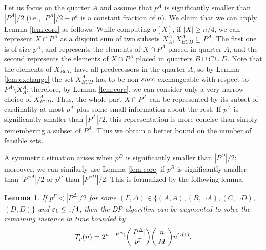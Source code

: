 \documentclass{article}
\newtheorem{lemma}[theorem]{Lemma}
\theoremstyle{definition}
\begin{document}
Let us focus on the quarter $A$ and assume that $p^A$ is significantly smaller than $|P^A|/2$ (i.e., $|P^A|/2 - p^a$ is a constant fraction of $n$).
We claim that we can apply Lemma \ref{lem:core} as follows.
While computing $\sigma[X]$, if $|X| \geq n/4$, we can represent $X \cap P^A$ as a disjoint sum of two subsets $X^A_A, X^A_{BCD} \subseteq P^A$. The first one
is of size $p^A$, and represents the elements of $X \cap P^A$ placed in quarter $A$, and the second represents the elements
of $X \cap P^A$ placed in quarters $B \cup C \cup D$. Note that the elements of $X^A_{BCD}$ have all predecessors in the quarter $A$, so by Lemma \ref{lem:exchange} the set $X^A_{BCD}$ has to be non-${succ}$-exchangeable with respect to $P^A \setminus X_A^A$; therefore, by Lemma \ref{lem:core}, we can consider only a very narrow choice of
$X^A_{BCD}$. Thus, the whole part $X\cap P^A$ can be represented by its subset of cardinality at most $p^A$ plus some small information about the rest. If $p^A$ is significantly smaller than $|P^A|/2$, this representation is more concise than simply remembering a subset of $P^A$. Thus we obtain a better bound on the number of feasible sets.

A symmetric situation arises when $p^D$ is significantly smaller than $|P^D|/2$; moreover, we can similarly use Lemma \ref{lem:core} if $p^B$ is significantly smaller than $|P^{\neg A}|/2$ or $p^C$ than $|P^{\neg D}|/2$. This is formalized by the following lemma.
\begin{lemma}\label{lem:quarters0}
If $p^\Gamma < |P^\Delta|/2$ for some $(\Gamma, \Delta) \in \{(A,A),(B,\neg A), (C,\neg D),$ $(D,D)\}$ and $\varepsilon_1 \leq 1/4$,
then the DP algorithm can be augmented to solve the remaining instance in time bounded by
$$T_p (n) = 2^{n-|P^\Delta|} \binom{|P^\Delta|}{p^\Gamma} \binom{n}{|M|} n^{O(1)}.$$
\end{lemma}
\end{document}
